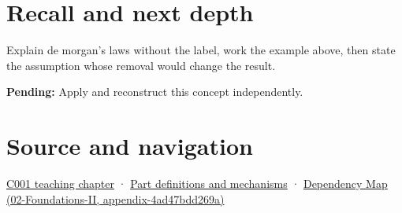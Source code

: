 \section{Recall and next depth}\label{appendix-9079d3659da4-recall-and-next-depth}

Explain de morgan's laws without the label, work the example above, then state the assumption whose removal would change the result.

\textbf{Pending:} Apply and reconstruct this concept independently.

\section{Source and navigation}\label{appendix-9079d3659da4-source-and-navigation}

\href{Continuous\%20Notes/Computing\%20Foundations\%20-\%20From\%20Bits\%20to\%20C++\%20and\%20Systems\%20APIs\#From\%20a\%20signal\%20to\%20an\%20interpretation}{C001 teaching chapter} · \hyperref[appendix-fd090d982a15]{Part definitions and mechanisms} · \href{../02-Foundations-II/main.pdf\#nameddest=appendix-4ad47bdd269a}{Dependency Map (02-Foundations-II, appendix-4ad47bdd269a)}
